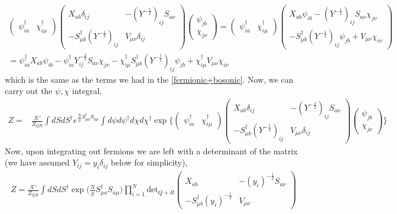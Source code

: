 \documentclass[english]{article}
\newcommand{\half}{\frac{1}{2}}
\renewcommand{\>}{\rangle}
\newcommand{\<}{\langle}
\newcommand{\de}{\delta}
\renewcommand{\(}{\left(}
\renewcommand{\)}{\right)}
\begin{document}
\begin{align}
    \begin{pmatrix}
\psi^{\dagger}_{ia}& \chi_{i\mu}^\dagger
\end{pmatrix}\begin{pmatrix}
    X_{ab}\delta_{ij} & -(Y^{-\half})_{ij}S_{a\nu}\\ 
    - S^{\dagger}_{\mu b}(Y^{-\half})_{ij}& V_{\mu\nu}\delta_{ij}
\end{pmatrix}\begin{pmatrix}
 \psi_{jb} \\ \chi_{j\nu}  
\end{pmatrix}=\begin{pmatrix}
\psi^{\dagger}_{ia}& \chi_{i\mu}^\dagger
\end{pmatrix}\begin{pmatrix}
    X_{ab}\psi_{ib}-(Y^{-\half})_{ij}S_{a\nu}\chi_{j\nu}\\
    - S^\dagger_{\mu b}(Y^{-\half})_{ij}\psi_{jb}+V_{\mu\nu}\chi_{i\nu}
\end{pmatrix}\nonumber\\
=\psi^{\dagger}_{ia}X_{ab}\psi_{ib}-\psi^{\dagger}_{ia}Y^{-\half}_{ij}S_{a\nu}\chi_{j\nu}-\chi_{i\mu}^{\dagger} S^\dagger_{\mu b}(Y^{-\half})_{ij}\psi_{jb}+\chi_{i\mu}^{\dagger}V_{\mu\nu}\chi_{i\nu}
\end{align}
which is the same as the terms we had in the \eqref{fermionic+bosonic}. Now, we can carry out the $\psi, \chi$ integral,
\begin{align}
Z=&\frac{\mathcal{K}'}{Z_{QR}}\int d S d S^{\dagger}e^{\frac{N}{g} S^{\dagger}_{\mu a}S_{a\mu}} \int d\psi d\psi^{\dagger}d\chi d\chi^{\dagger}\exp\bigg\{\begin{pmatrix}
\psi^{\dagger}_{ia}& \chi_{i\mu}^\dagger
\end{pmatrix}\begin{pmatrix}
    X_{ab}\delta_{ij} & -(Y^{-\half})_{ij}S_{a\nu}\\ 
    - S^{\dagger}_{\mu b}(Y^{-\half})_{ij}& V_{\mu\nu}\delta_{ij}
\end{pmatrix}\begin{pmatrix}
 \psi_{jb} \\ \chi_{j\nu}  
\end{pmatrix}\bigg\}
\end{align}
Now, upon integrating out fermions we are left with a determinant of the matrix (we have assumed $Y_{ij} = y_i \de_{ij}$ below for simplicity),
\begin{align}
    Z=\frac{\mathcal{K}'}{Z_{QR}}\int d S d S^{\dagger}\exp\bigg( \frac{N}{g} S^{\dagger}_{\mu a}S_{a\mu} \bigg)\prod_{i=1}^N\text{det}_{Q+R}\begin{pmatrix}
    X_{ab} & -(y_i)^{-\half}S_{a\nu}\\ 
    - S^{\dagger}_{\mu b}(y_{i})^{-\half}& V_{\mu\nu}
\end{pmatrix}
\end{align}
\end{document}
